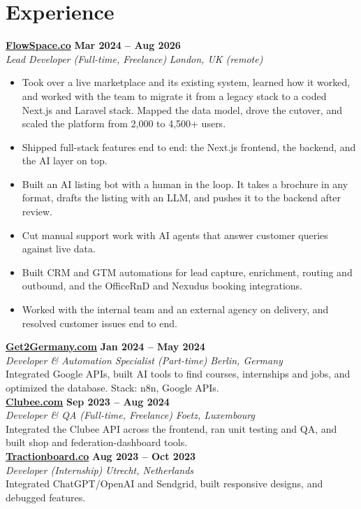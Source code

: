 \documentclass[a4paper,10pt]{article}
\newcommand{\role}[4]{%
 \textbf{#1} \hfill \textbf{#2}\\[1pt]%
 \textit{#3} \hfill \textit{#4}\\[2pt]%
}
\begin{document}
\section{Experience}

\role{\href{https://flowspace.co}{FlowSpace.co}}{Mar 2024 -- Aug 2026}{Lead Developer (Full-time, Freelance)}{London, UK (remote)}
\begin{itemize}
 \item Took over a live marketplace and its existing system, learned how it worked, and worked with the team to migrate it from a legacy stack to a coded Next.js and Laravel stack. Mapped the data model, drove the cutover, and scaled the platform from 2,000 to 4,500+ users.
 \item Shipped full-stack features end to end: the Next.js frontend, the backend, and the AI layer on top.
 \item Built an AI listing bot with a human in the loop. It takes a brochure in any format, drafts the listing with an LLM, and pushes it to the backend after review.
 \item Cut manual support work with AI agents that answer customer queries against live data.
 \item Built CRM and GTM automations for lead capture, enrichment, routing and outbound, and the OfficeRnD and Nexudus booking integrations.
 \item Worked with the internal team and an external agency on delivery, and resolved customer issues end to end.
\end{itemize}

\role{\href{https://get2germany.com}{Get2Germany.com}}{Jan 2024 -- May 2024}{Developer \& Automation Specialist (Part-time)}{Berlin, Germany}
Integrated Google APIs, built AI tools to find courses, internships and jobs, and optimized the database. Stack: n8n, Google APIs.\\[1pt]

\role{\href{https://clubee.com}{Clubee.com}}{Sep 2023 -- Aug 2024}{Developer \& QA (Full-time, Freelance)}{Foetz, Luxembourg}
Integrated the Clubee API across the frontend, ran unit testing and QA, and built shop and federation-dashboard tools.\\[1pt]

\role{\href{https://tractionboard.co}{Tractionboard.co}}{Aug 2023 -- Oct 2023}{Developer (Internship)}{Utrecht, Netherlands}
Integrated ChatGPT/OpenAI and Sendgrid, built responsive designs, and debugged features.
\end{document}
